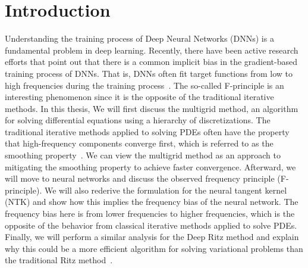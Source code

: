 \documentclass[letterpaper,12pt]{article}
\begin{document}


\newpage

\section{Introduction}
Understanding the training process of Deep Neural Networks (DNNs) is a fundamental problem in deep learning. Recently, there have been active research efforts that point out that there is a common implicit bias in the gradient-based training process of DNNs. That is, DNNs often fit target functions from low to high frequencies during the training process~\cite{basri2019convergence,Xu_2020}. The so-called F-principle is an interesting phenomenon since it is the opposite of the traditional iterative methods. In this thesis, We will first discuss the multigrid method, an algorithm for solving differential equations using a hierarchy of discretizations. The traditional iterative methods applied to solving PDEs often have the property that high-frequency components converge first, which is referred to as the smoothing property~\cite{saad2003iterative}. We can view the multigrid method as an approach to mitigating the smoothing property to achieve faster convergence. Afterward, we will move to neural networks and discuss the observed frequency principle (F-principle). We will also rederive the formulation for the neural tangent kernel (NTK) and show how this implies the frequency bias of the neural network. The frequency bias here is from lower frequencies to higher frequencies, which is the opposite of the behavior from classical iterative methods applied to solve PDEs. Finally, we will perform a similar analysis for the Deep Ritz method and explain why this could be a more efficient algorithm for solving variational problems than the traditional Ritz method~\cite{10.5555/357695,e2017deep, arora2019finegrained,du2019gradient}.
\end{document}
